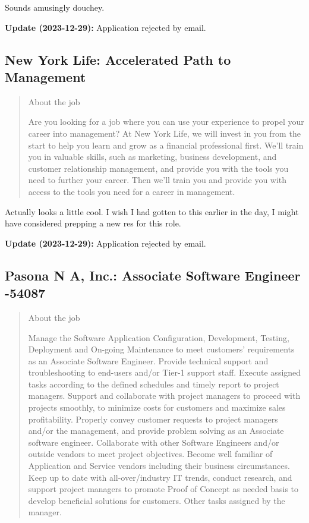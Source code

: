\documentclass[
	letterpaper, %
	12pt, %
]{CSSullivanBusinessReport}
\begin{document}
Sounds amusingly douchey.

\textbf{Update (2023-12-29):} Application rejected by email.


\subsection[New York Life]{New York Life: Accelerated Path to Management}

\begin{quote}
	About the job
	
	Are you looking for a job where you can use your experience to propel your career into management? At New York Life, we will invest in you from the start to help you learn and grow as a financial professional first. We’ll train you in valuable skills, such as marketing, business development, and customer relationship management, and provide you with the tools you need to further your career. Then we’ll train you and provide you with access to the tools you need for a career in management.

\end{quote}

Actually looks a little cool. I wish I had gotten to this earlier in the day, I might have considered prepping a new res for this role. 

\textbf{Update (2023-12-29):} Application rejected by email.


\subsection[Pasona N A, Inc.]{Pasona N A, Inc.: Associate Software Engineer -54087}

\begin{quote}
	About the job
	
    Manage the Software Application Configuration, Development, Testing, Deployment and On-going Maintenance to meet customers’ requirements as an Associate Software Engineer.
    Provide technical support and troubleshooting to end-users and/or Tier-1 support staff.
    Execute assigned tasks according to the defined schedules and timely report to project managers.
    Support and collaborate with project managers to proceed with projects smoothly, to minimize costs for customers and maximize sales profitability.
    Properly convey customer requests to project managers and/or the management, and provide problem solving as an Associate software engineer.
    Collaborate with other Software Engineers and/or outside vendors to meet project objectives.
    Become well familiar of Application and Service vendors including their business circumstances.
    Keep up to date with all-over/industry IT trends, conduct research, and support project managers to promote Proof of Concept as needed basis to develop beneficial solutions for customers.
    Other tasks assigned by the manager.


\end{quote}
\end{document}
